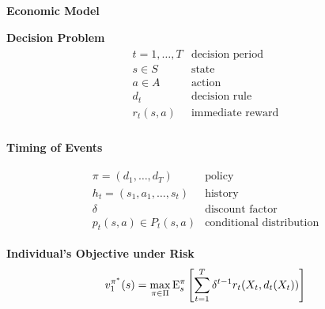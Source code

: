 \begin{frame}\begin{center}
\LARGE\textbf{Economic Model}
\end{center}\end{frame}
\begin{frame}
\textbf{Decision Problem}
\begin{align*}\begin{array}{ll}
t = 1, \hdots, T& \text{decision period} \\
s\in S & \text{state}  \\
a\in A & \text{action} \\
d_t & \text{decision rule} \\
r_t(s, a) & \text{immediate reward}\\
\end{array}\end{align*}
\end{frame}
\begin{frame}
\begin{center}\textbf{Timing of Events}\vspace{0.9cm}
\scalebox{0.9}{\hspace{-0.2cm}}
\end{center}
\end{frame}
\begin{frame}
\begin{align*}\begin{array}{ll}
\pi = (d_1, \hdots, d_T) & \text{policy}\\
h_t = (s_1, a_1, \hdots, s_t) & \text{history} \\
\delta & \text{discount factor} \\
p_t(s, a) \in P_t(s, a) & \text{conditional distribution}
\end{array}\end{align*}
\end{frame}
\begin{frame}
\textbf{Individual's Objective under Risk}\vspace{0.3cm}
\begin{align*}
v^{\pi^*}_1(s) = \max_{\pi\in\Pi} \mathrm{E}_{s}^\pi\left[\sum^{T}_{t = 1}  \delta^{t - 1} r_t(X_t, d_t(X_t))\right]
\end{align*}
\end{frame}
